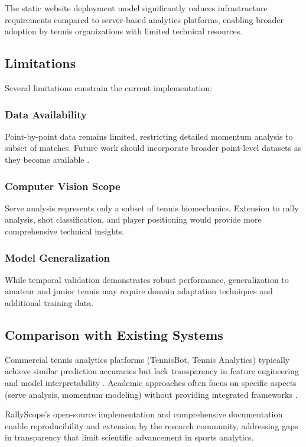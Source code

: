 \documentclass[11pt,a4paper]{article}
\begin{document}
The static website deployment model significantly reduces infrastructure requirements compared to server-based analytics platforms, enabling broader adoption by tennis organizations with limited technical resources.

\subsection{Limitations}

Several limitations constrain the current implementation:

\subsubsection{Data Availability}
Point-by-point data remains limited, restricting detailed momentum analysis to subset of matches. Future work should incorporate broader point-level datasets as they become available \citep{vracar2016modeling}.

\subsubsection{Computer Vision Scope}
Serve analysis represents only a subset of tennis biomechanics. Extension to rally analysis, shot classification, and player positioning would provide more comprehensive technical insights.

\subsubsection{Model Generalization}
While temporal validation demonstrates robust performance, generalization to amateur and junior tennis may require domain adaptation techniques and additional training data.

\subsection{Comparison with Existing Systems}

Commercial tennis analytics platforms (TennisBot, Tennis Analytics) typically achieve similar prediction accuracies but lack transparency in feature engineering and model interpretability \citep{tennis2023analytics}. Academic approaches often focus on specific aspects (serve analysis, momentum modeling) without providing integrated frameworks \citep{whiteside2017monitoring, volossovitch2019trends}.

RallyScope's open-source implementation and comprehensive documentation enable reproducibility and extension by the research community, addressing gaps in transparency that limit scientific advancement in sports analytics.
\end{document}
